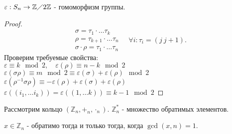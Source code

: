 \documentclass[11pt]{book}
\newcommand{\Z}{\mathbb{Z}}
\theoremstyle{definition}
\theoremstyle{plain}
\theoremstyle{plain}
\theoremstyle{definition}
\theoremstyle{remark}
\begin{document}
\begin{thm}
    $\varepsilon  :S_n \to \Z \diagup  2\Z$ - гомоморфизм группы.
\end{thm}
\begin{proof}
    \[
	\begin{array}{l}
	\sigma  = \tau_1 \cdot \ldots\tau_k \\
	\rho = \tau_{k+1} \cdot \ldots \tau_n\\
    \sigma \cdot \rho = \tau_1 \cdot \ldots \tau_n
    \end{array} \quad \forall i: \tau_i = (j~j+1)
    .\] 
    Проверим требуемые свойства: \\
    $\varepsilon \equiv k \mod 2, \quad \varepsilon (\rho) \equiv n-k\mod 2$\\
    $\varepsilon (\sigma \rho) \equiv m \mod 2 \equiv \varepsilon (\sigma ) + \varepsilon (\rho) \mod 2$ \\
    $\varepsilon (\rho^{-1} \sigma \rho) \equiv - \varepsilon (\rho) + \varepsilon (\sigma ) + \varepsilon (\rho)  $\\
    $\varepsilon ((i_1, \ldots i_k)) = \varepsilon ((1, \ldots k)) \equiv k-1 \mod 2$
\end{proof}
Рассмотрим кольцо $(\Z_n, +_n, \cdot_n)$. $\Z_n^* $ - множество обратимых элементов.

$x \in  \Z_n$ - обратимо тогда и только тогда, когда $\gcd(x, n) = 1$.
\end{document}
